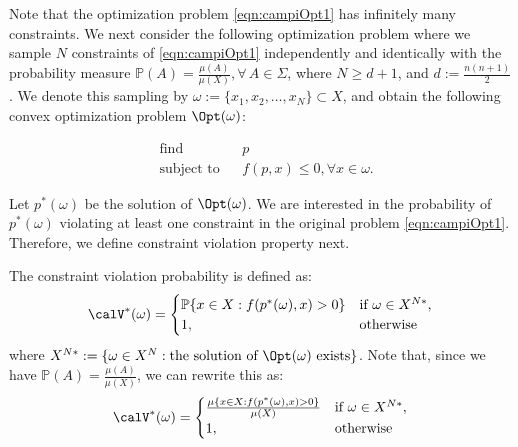Note that the optimization problem \eqref{eqn:campiOpt1} has infinitely many constraints. We next consider the following optimization problem where we sample $N$ constraints of \eqref{eqn:campiOpt1} independently and identically with the probability measure
$\mathbb{P}(A) = \frac{\mu(A)}{\mu(X)}, \forall\, A \in \Sigma$, where $N \geq d+1$, and $d := \frac{n(n+1)}{2}$. We denote this sampling by $\omega:=\{x_1, x_2, \ldots, x_N\} \subset X$, and obtain the following convex optimization problem $\Opt(\omega)$: 

\begin{equation}
\label{eqn:campiOpt2}
\begin{aligned}
& \text{find} & & p \\
& \text{subject to} 
& & f(p, x) \leq 0, \forall x \in \omega. \end{aligned}
\end{equation}

Let $p^*(\omega)$ be the solution of $\Opt(\omega)$. We are interested in the probability of $p^*(\omega)$ violating at least one constraint in the original problem \eqref{eqn:campiOpt1}. Therefore, we define constraint violation property next.

\begin{definition} The constraint violation probability is defined as:
\begin{equation*}
\calV^*(\omega)=
    \begin{cases}
      \mathbb{P}\{x \in X: f(p^*(\omega), x) > 0\} &\text{if}\,\, \omega \in X^{N*},\\
      1, & \text{otherwise}
    \end{cases}
\end{equation*}
where $X^{N*}:=\{\omega \in X^N: \text{the solution of $\Opt(\omega)$ exists}\}$. 
Note that, since we have $\mathbb{P}(A) = \frac{\mu(A)}{\mu(X)}$, we can rewrite this as:
\begin{equation*}
\calV^*(\omega)=
    \begin{cases}
      \frac{\mu\{x \in X: f(p^*(\omega), x) > 0\}}{\mu(X)} &\text{if}\,\, \omega \in X^{N*},\\
      1, & \text{otherwise}
    \end{cases}
\end{equation*}
\end{definition}

